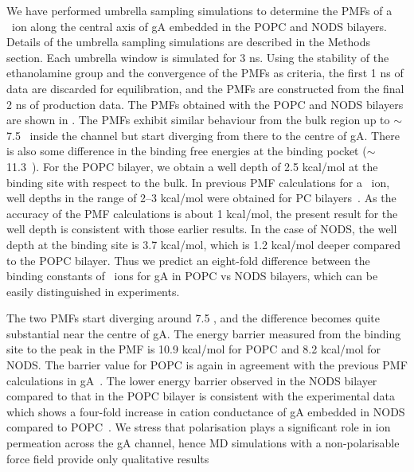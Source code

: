We have performed umbrella sampling simulations to determine the PMFs of a \K\ ion along the 
central axis of gA embedded in the POPC and NODS bilayers. Details of the umbrella sampling 
simulations are described in the Methods section. Each umbrella window is simulated for 3 ns. 
Using the stability of the ethanolamine group and the convergence of the PMFs as criteria, 
the first 1 ns of data are discarded for equilibration, and the PMFs are constructed from the 
final 2 ns of production data. The PMFs obtained with the POPC and NODS bilayers are shown in 
. The PMFs exhibit similar behaviour from the bulk region up to $\sim$7.5 \angs\ 
inside the channel but start diverging from there to the centre of gA. There is also some difference 
in the binding free energies at the binding pocket ($\sim$11.3~\angs). For the POPC bilayer, we 
obtain a well depth of 2.5 kcal/mol at the binding site with respect to the bulk. In previous PMF 
calculations for a \K\ ion, well depths in the range of 2--3 kcal/mol were obtained for PC
bilayers~\cite{Allen2003,Allen2006,Bastug2006c,Bastug2007}. As the accuracy of the PMF calculations 
is about 1 kcal/mol, the present result for the well depth is consistent with those earlier results. 
In the case of NODS, the well depth at the binding site is 3.7 kcal/mol, which is 1.2 kcal/mol deeper 
compared to the POPC bilayer. Thus we predict an eight-fold difference between the binding constants 
of \K\ ions for gA in POPC vs NODS bilayers, which can be easily distinguished in experiments.

The two PMFs start diverging around 7.5 \angs, and the difference becomes quite substantial near
the centre of gA. The energy barrier measured from the binding site to the peak in the PMF is 10.9 
kcal/mol for POPC and 8.2 kcal/mol for NODS. The barrier value for POPC is again in agreement with 
the previous PMF calculations in gA~\cite{Allen2003,Allen2006,Bastug2006c,Bastug2007}. The lower 
energy barrier observed in the NODS bilayer compared to that in the POPC bilayer is consistent with 
the experimental data which shows a four-fold increase in cation conductance of gA embedded in NODS 
compared to POPC~\cite{DeGodoy2011}. We stress that polarisation plays a significant role in ion 
permeation across the gA channel, hence MD simulations with a non-polarisable force field provide 
only qualitative results


